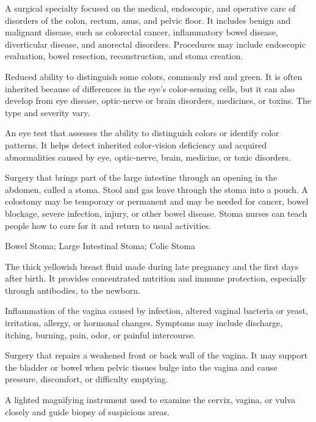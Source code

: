  A surgical specialty focused on the medical, endoscopic, and operative care of disorders of the colon, rectum, anus, and pelvic floor.
It includes benign and malignant disease, such as colorectal cancer, inflammatory
bowel disease, diverticular disease, and anorectal disorders. Procedures may
include endoscopic evaluation, bowel resection, reconstruction, and stoma creation.

 Reduced ability to distinguish some colors, commonly red and green. It is often inherited because of differences in the eye’s color-sensing cells, but it can also develop from eye disease, optic-nerve or brain disorders, medicines, or toxins. The type and severity vary.

 An eye test that assesses the ability to distinguish colors or identify color patterns. It helps detect inherited color-vision deficiency and acquired abnormalities caused by eye, optic-nerve, brain, medicine, or toxic disorders.

 Surgery that brings part of the large intestine through an opening in the abdomen, called a stoma. Stool and gas leave through the stoma into a pouch. A colostomy may be temporary or permanent and may be needed for cancer, bowel blockage, severe infection, injury, or other bowel disease. Stoma nurses can teach people how to care for it and return to usual activities.

\synonyms
Bowel Stoma; Large Intestinal Stoma; Colic Stoma

 The thick yellowish breast fluid made during late pregnancy and the first days after birth. It provides concentrated nutrition and immune protection, especially through antibodies, to the newborn.

 Inflammation of the vagina caused by infection, altered vaginal bacteria or yeast, irritation, allergy, or hormonal changes. Symptoms may include discharge, itching, burning, pain, odor, or painful intercourse.

 Surgery that repairs a weakened front or back wall of the vagina. It may support the bladder or bowel when pelvic tissues bulge into the vagina and cause pressure, discomfort, or difficulty emptying.

 A lighted magnifying instrument used to examine the cervix, vagina, or vulva closely and guide biopsy of suspicious areas.

